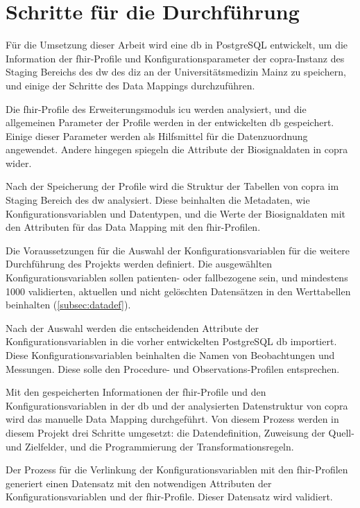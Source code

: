 \section{Schritte für die Durchführung} \label{sec:steps}

Für die Umsetzung dieser Arbeit wird eine \ac{db} in PostgreSQL entwickelt, um die Information der \ac{fhir}-Profile und Konfigurationsparameter der \ac{copra}-Instanz des Staging Bereichs des \ac{dw} des \ac{diz} an der Universitätsmedizin Mainz zu speichern, und einige der Schritte des Data Mappings durchzuführen.

Die \ac{fhir}-Profile des Erweiterungsmoduls \glqq\ac{icu}\grqq{} werden analysiert, und die allgemeinen Parameter der Profile werden in der entwickelten \ac{db} gespeichert. Einige dieser Parameter werden als Hilfsmittel für die Datenzuordnung angewendet. Andere hingegen spiegeln die Attribute der Biosignaldaten in \ac{copra} wider.

Nach der Speicherung der Profile wird die Struktur der Tabellen von \ac{copra} im Staging Bereich des \ac{dw} analysiert. Diese beinhalten die Metadaten, wie Konfigurationsvariablen und Datentypen, und die Werte der Biosignaldaten mit den Attributen für das Data Mapping mit den \ac{fhir}-Profilen. 

Die Voraussetzungen für die Auswahl der Konfigurationsvariablen für die weitere Durchführung des Projekts werden definiert. Die ausgewählten Konfigurationsvariablen sollen patienten- oder fallbezogene sein, und mindestens 1000 validierten, aktuellen und nicht gelöschten Datensätzen in den Werttabellen beinhalten (\ref{subsec:datadef}).

Nach der Auswahl werden die entscheidenden Attribute der Konfigurationsvariablen in die vorher entwickelten PostgreSQL \ac{db} importiert. Diese Konfigurationsvariablen beinhalten die Namen von Beobachtungen und Messungen. Diese solle den \glqq Procedure\grqq{}- und \glqq Observations\grqq{}-Profilen entsprechen.

Mit den gespeicherten Informationen der \ac{fhir}-Profile und den Konfigurationsvariablen in der \ac{db} und der analysierten Datenstruktur von \ac{copra} wird das manuelle Data Mapping durchgeführt. Von diesem Prozess werden in diesem Projekt drei Schritte umgesetzt: die Datendefinition, Zuweisung der Quell- und Zielfelder, und die Programmierung der Transformationsregeln.

Der Prozess für die Verlinkung der Konfigurationsvariablen mit den \ac{fhir}-Profilen generiert einen Datensatz mit den notwendigen Attributen der Konfigurationsvariablen und der \ac{fhir}-Profile. Dieser Datensatz wird validiert.

